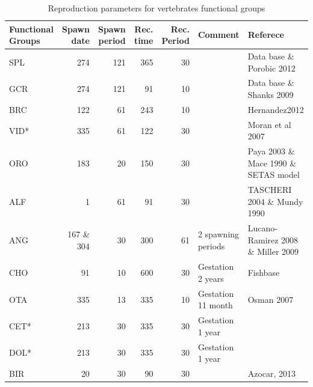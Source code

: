 \documentclass[11pt]{article}
\begin{document}
\begin{table}[htb]
\caption{Reproduction parameters for vertebrates functional groups}
\begin{center}
\begin{tabular}{lrrrrll}
 Functional Groups  &   Spawn date  &  Spawn period  &  Rec. time  &  Rec. Period  &  Comment             &  Referece                                 \\
\hline
 SPL                &          274  &           121  &        365  &           30  &                      &  Data base \& Porobic 2012                \\
 GCR                &          274  &           121  &         91  &           10  &                      &  Data base   \& Shanks 2009               \\
 BRC                &          122  &            61  &        243  &           10  &                      &  Hernandez2012                            \\
 VID*               &          335  &            61  &        122  &           30  &                      &  Moran et al 2007                         \\
 ORO                &          183  &            20  &        150  &           30  &                      &  Paya 2003  \& Mace 1990  \& SETAS model  \\
 ALF                &            1  &            61  &         91  &           30  &                      &  TASCHERI 2004  \& Mundy 1990             \\
 ANG                &  167  \& 304  &            30  &        300  &           61  &  2 spawning periods  &  Lucano-Ramirez 2008  \& Miller 2009      \\
 CHO                &           91  &            10  &        600  &           30  &  Gestation 2 years   &  Fishbase                                 \\
 OTA                &          335  &            13  &        335  &           10  &  Gestation 11 month  &  Osman 2007                               \\
 CET*               &          213  &            30  &        335  &           30  &  Gestation 1 year    &                                           \\
 DOL*               &          213  &            30  &        335  &           30  &  Gestation 1 year    &                                           \\
 BIR                &           20  &            30  &         90  &           30  &                      &  Azocar,  2013                            \\

\end{tabular}
\end{center}
\end{table}
\end{document}
